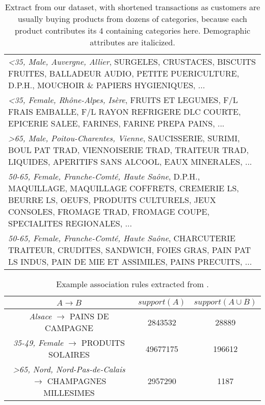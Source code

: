\begin{table}[t!]
\centering
\begin{scriptsize}
\def\arraystretch{1.5}
\begin{tabular}{p{}}
  {\em <35, Male, Auvergne, Allier}, SURGELES, CRUSTACES, BISCUITS FRUITES, BALLADEUR AUDIO,
    PETITE PUERICULTURE, D.P.H., MOUCHOIR \& PAPIERS HYGIENIQUES, ... \\
  {\em <35, Female, Rhône-Alpes, Isère}, FRUITS ET LEGUMES, F/L FRAIS EMBALLE, F/L RAYON REFRIGERE DLC COURTE,
    EPICERIE SALEE, FARINES, FARINE PREPA PAINS, ... \\
  {\em >65, Male, Poitou-Charentes, Vienne}, SAUCISSERIE, SURIMI, BOUL PAT TRAD, VIENNOISERIE TRAD,
    TRAITEUR TRAD, LIQUIDES, APERITIFS SANS ALCOOL, EAUX MINERALES, ...\\
  {\em 50-65,  Female, Franche-Comté, Haute Saône}, D.P.H., MAQUILLAGE, MAQUILLAGE COFFRETS, CREMERIE LS, BEURRE LS, OEUFS, PRODUITS CULTURELS,
    JEUX CONSOLES, FROMAGE TRAD, FROMAGE COUPE, SPECIALITES REGIONALES, ... \\
  {\em  50-65,  Female, Franche-Comté, Haute Saône}, CHARCUTERIE TRAITEUR, CRUDITES, SANDWICH, FOIES GRAS,
    PAIN PAT LS INDUS, PAIN DE MIE ET ASSIMILES, PAINS PRECUITS, ...\\
\end{tabular}
\caption{
  Extract from our \demoassoc dataset, with shortened transactions as customers
  are usually buying products from dozens of categories,
  because each product contributes its 4 containing categories here.
  Demographic attributes are italicized.
  \label{tab:extracts:demo}
}
\end{scriptsize}
\end{table}


\begin{table}[t!]
\centering
\begin{scriptsize}
\def\arraystretch{1.2}
\begin{tabular}{|c|c|c|}
  \hline
  $A \rightarrow B$       & $\mathit{support}(A)$ & $\mathit{support}(A \cup B)$ \\\hline
  {\em Alsace} $\rightarrow$ PAINS DE CAMPAGNE & \num{2843532} & \num{28889}  \\
  {\em 35-49, Female} $\rightarrow$  PRODUITS SOLAIRES  & \num{49677175}& \num{196612}   \\
  {\em >65, Nord, Nord-Pas-de-Calais} $\rightarrow$ CHAMPAGNES MILLESIMES  & \num{2957290}     & \num{1187}   \\
  \hline
\end{tabular}
\caption{
  Example association rules extracted from \demoassoc.
  \label{tab:extracts:demo:rules}
}
\end{scriptsize}
\end{table}
